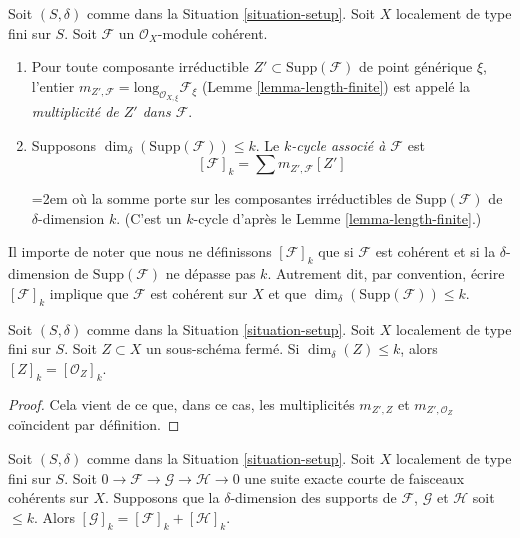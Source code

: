\begin{definition}
\label{definition-cycle-associated-to-coherent-sheaf}
Soit $(S, \delta)$ comme dans la Situation \ref{situation-setup}.
Soit $X$ localement de type fini sur $S$.
Soit $\mathcal{F}$ un $\mathcal{O}_X$-module cohérent.
\begin{enumerate}
\item Pour toute composante irréductible $Z' \subset \text{Supp}(\mathcal{F})$
de point générique $\xi$, l'entier
$m_{Z', \mathcal{F}} = \text{long}_{\mathcal{O}_{X, \xi}} \mathcal{F}_\xi$
(Lemme \ref{lemma-length-finite})
est appelé la {\it multiplicité de $Z'$ dans $\mathcal{F}$}.
\item Supposons $\dim_\delta(\text{Supp}(\mathcal{F})) \leq k$.
Le {\it $k$-cycle associé à $\mathcal{F}$} est
$$
[\mathcal{F}]_k
=
\sum m_{Z', \mathcal{F}}[Z']
$$
{\emergencystretch=2em où la somme porte sur les composantes irréductibles de
$\text{Supp}(\mathcal{F})$ de $\delta$-dimension $k$.
(C'est un $k$-cycle d'après le Lemme \ref{lemma-length-finite}.)\par}
\end{enumerate}
\end{definition}

\noindent
Il importe de noter que nous ne définissons $[\mathcal{F}]_k$
que si $\mathcal{F}$ est cohérent et si la $\delta$-dimension
de $\text{Supp}(\mathcal{F})$ ne dépasse pas $k$. Autrement dit,
par convention, écrire $[\mathcal{F}]_k$ implique que
$\mathcal{F}$ est cohérent sur $X$ et que
$\dim_\delta(\text{Supp}(\mathcal{F})) \leq k$.

\begin{lemma}
\label{lemma-cycle-closed-coherent}
Soit $(S, \delta)$ comme dans la Situation \ref{situation-setup}.
Soit $X$ localement de type fini sur $S$.
Soit $Z \subset X$ un sous-schéma fermé.
Si $\dim_\delta(Z) \leq k$, alors $[Z]_k = [{\mathcal O}_Z]_k$.
\end{lemma}

\begin{proof}
Cela vient de ce que, dans ce cas, les multiplicités $m_{Z', Z}$ et
$m_{Z', \mathcal{O}_Z}$ coïncident par définition.
\end{proof}

\begin{lemma}
\label{lemma-additivity-sheaf-cycle}
Soit $(S, \delta)$ comme dans la Situation \ref{situation-setup}.
Soit $X$ localement de type fini sur $S$.
Soit $0 \to \mathcal{F} \to \mathcal{G} \to \mathcal{H} \to 0$
une suite exacte courte de faisceaux cohérents sur $X$.
Supposons que la $\delta$-dimension des supports
de $\mathcal{F}$, $\mathcal{G}$ et $\mathcal{H}$ soit $\leq k$.
Alors $[\mathcal{G}]_k = [\mathcal{F}]_k + [\mathcal{H}]_k$.
\end{lemma}

